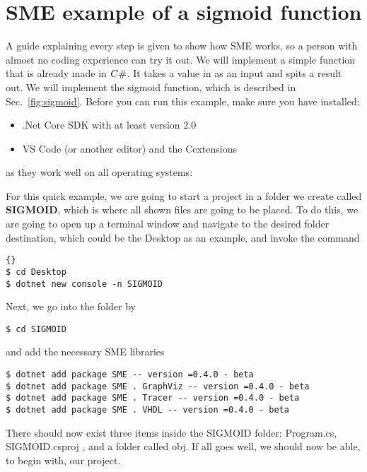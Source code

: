 \section{SME example of a sigmoid function}
\label{appendix:Sme_guide}
A guide explaining every step is given to show how SME works, so a person with almost no coding experience can try it out. We will implement a simple function that is already made in $C\#$. It takes a value in as an input and spits a result out.
We will implement the sigmoid function, which is described in Sec.~\ref{fig:sigmoid}.
Before you can run this example, make sure you have installed:
\begin{itemize}
\item .Net Core SDK with at least version 2.0
\item VS Code (or another editor) and the C\texthash extensions \\
\end{itemize}
as they work well on all operating systems:



For this quick example, we are going to start a project in a folder we create called \textbf{SIGMOID},
which is where all shown files are going to be placed. 
To do this, we are going to open up a terminal window and navigate to the desired folder destination, which could be the Desktop as an example, and invoke the command \\

\begin{lstlisting}{}
$ cd Desktop
$ dotnet new console -n SIGMOID
\end{lstlisting}

Next, we go into the folder by 
\begin{lstlisting}
$ cd SIGMOID
\end{lstlisting} 

and add the necessary SME libraries
\begin{lstlisting}
$ dotnet add package SME -- version =0.4.0 - beta
$ dotnet add package SME . GraphViz -- version =0.4.0 - beta
$ dotnet add package SME . Tracer -- version =0.4.0 - beta
$ dotnet add package SME . VHDL -- version =0.4.0 - beta
\end{lstlisting} 


There should now exist three items inside the SIGMOID folder: Program.cs, SIGMOID.csproj
, and a folder called obj. If all goes well, we should now be able, to begin with, our project.\\ 

